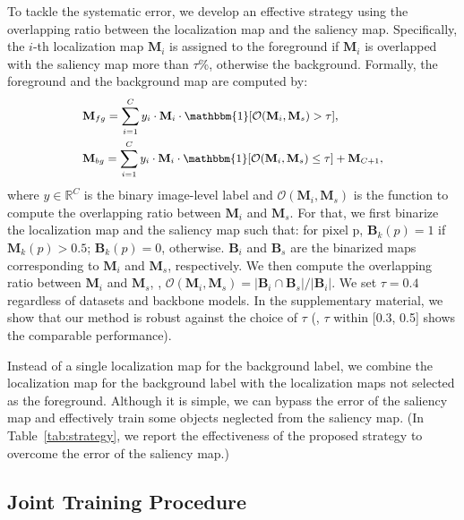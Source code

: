 \documentclass[final]{cvpr}
\begin{document}
To tackle the systematic error, we develop an effective strategy using the overlapping ratio between the localization map and the saliency map. Specifically, the $i$-th localization map $\mathbf{M}_{i}$ is assigned to the foreground if $\mathbf{M}_{i}$ is overlapped with the saliency map more than $\tau$\%, otherwise the background. Formally, the foreground and the background map are computed by: \vspace{-1mm}
\begin{equation}
\label{eq_map_selection}
{\small
\begin{split}
&\mathbf{M}_{fg} = \sum_{i=1}^{C} {y_{i} \cdot \mathbf{M}_{i} \cdot \mathbbm{1}[\mathcal{O}(\mathbf{M}_i, \mathbf{M}_{s}) > \tau]}, \\
&\mathbf{M}_{bg} = \sum_{i=1}^{C} {y_{i} \cdot \mathbf{M}_{i} \cdot \mathbbm{1}[\mathcal{O}(\mathbf{M}_i, \mathbf{M}_{s}) \le \tau]} + \mathbf{M}_{C+1},
\end{split}}\vspace{-1mm}
\end{equation}
\noindent where $y \in \mathbb{R}^C$ is the binary image-level label and $\mathcal{O}(\mathbf{M}_i, \mathbf{M}_{s})$ is the function to compute the overlapping ratio between $\mathbf{M}_i$ and $\mathbf{M}_{s}$. For that, we first binarize the localization map and the saliency map such that: for pixel p, $\mathbf{B}_{k}(p) = 1$ if $\mathbf{M}_{k}(p) > 0.5$; $\mathbf{B}_{k}(p) = 0$, otherwise. $\mathbf{B}_{i}$ and $\mathbf{B}_{s}$ are the binarized maps corresponding to $\mathbf{M}_i$ and $\mathbf{M}_{s}$, respectively. We then compute the overlapping ratio between $\mathbf{M}_i$ and $\mathbf{M}_{s}$, \ie, $\mathcal{O}(\mathbf{M}_i ,\mathbf{M}_{s}) = |\mathbf{B}_i \cap \mathbf{B}_{s}| / |\mathbf{B}_{i}|$. We set $\tau=0.4$ regardless of datasets and backbone models. In the supplementary material, we show that our method is robust against the choice of $\tau$ (\ie, $\tau$ within [0.3, 0.5] shows the comparable performance). 


Instead of a single localization map for the background label, we combine the localization map for the background label with the localization maps not selected as the foreground. Although it is simple, we can bypass the error of the saliency map and effectively train some objects neglected from the saliency map. (In Table~\ref{tab:strategy}, we report the effectiveness of the proposed strategy to overcome the error of the saliency map.)



\subsection{Joint Training Procedure}\label{section3.3}
\end{document}
